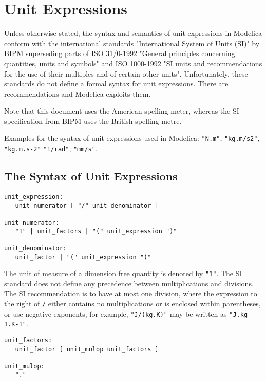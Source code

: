 \chapter{Unit Expressions}

Unless otherwise stated, the syntax and semantics of unit expressions in
Modelica conform with the international standards 
"International System of Units (SI)" by BIPM superseding parts of 
ISO 31/0-1992
"General principles concerning quantities, units and symbols" and ISO
1000-1992 "SI units and recommendations for the use of their multiples
and of certain other units". 
Unfortunately, these standards do not define a formal syntax for
unit expressions. There are recommendations and Modelica exploits them.

Note that this document uses the American spelling meter, whereas the SI specification from BIPM uses the British spelling metre.

Examples for the syntax of unit expressions used in Modelica: \lstinline!"N.m"!,
\lstinline!"kg.m/s2"!, \lstinline!"kg.m.s-2"! \lstinline!"1/rad"!, 
\lstinline!"mm/s"!.

\section{The Syntax of Unit Expressions}
\begin{lstlisting}[language=grammar]
unit_expression:
   unit_numerator [ "/" unit_denominator ]
   
unit_numerator:
   "1" | unit_factors | "(" unit_expression ")"
   
unit_denominator:
   unit_factor | "(" unit_expression ")"
\end{lstlisting}

The unit of measure of a dimension free quantity is denoted by \lstinline!"1"!. The
SI standard does not define any precedence between multiplications and
divisions. The SI recommendation is to have at most one division, where
the expression to the right of \lstinline!/! either contains no multiplications or
is enclosed within parentheses, or use negative
exponents, for example, \lstinline!"J/(kg.K)"! may be written as \lstinline!"J.kg-1.K-1"!.

\begin{lstlisting}[language=grammar]
unit_factors:
   unit_factor [ unit_mulop unit_factors ]

unit_mulop:
   "."
\end{lstlisting}

